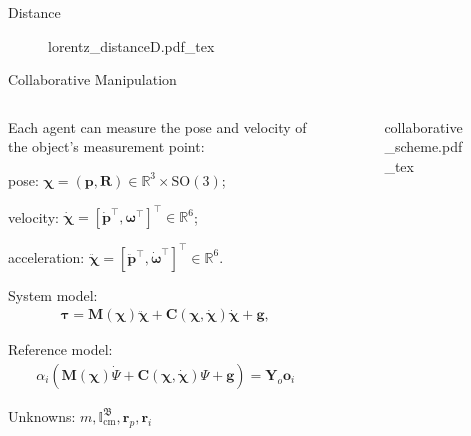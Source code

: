 \begin{frame}{Distance}
    \begin{figure}[ht!]
        \centering
        \def\svgwidth{.9\linewidth}
        {\scriptsize{lorentz_distanceD.pdf_tex}}
    \end{figure}
\end{frame}

\begin{frame}{Collaborative Manipulation}
    \begin{columns}[c]
        \begin{column}{0.4\linewidth}
            Each agent can measure the pose and velocity of the object's measurement point:

            \quad pose: $\boldsymbol{\chi} = (\mathbf{p}, \mathbf{R}) \in \mathbb{R}^3\times \text{SO}(3)$;
            
            \quad velocity: $\dot{\boldsymbol{\chi}} = \left[\dot{\mathbf{p}}^\top, \boldsymbol{\omega}^\top \right]^\top\in\mathbb{R}^6$;
            
            \quad acceleration: $\ddot{\boldsymbol{\chi}} = \left[\ddot{\mathbf{p}}^\top, \dot{\boldsymbol{\omega}}^\top \right]^\top\in\mathbb{R}^6$.

            System model:
            \begin{align*}
                \boldsymbol{\tau } = \mathbf {M}(\boldsymbol{\chi})\ddot{\boldsymbol{\chi}} + \mathbf {C}(\boldsymbol{\chi},\dot{\boldsymbol{\chi}})\dot{\boldsymbol{\chi}} + \mathbf{g},
            \end{align*}

            Reference model:
            \begin{align*}
                \alpha _i \left(\mathbf {M}(\boldsymbol{\chi})\dot{\Psi} + \mathbf {C}(\boldsymbol{\chi},\dot{\boldsymbol{\chi}})\Psi + \mathbf {g} \right) = \mathbf{Y}_o\mathbf{o}_i
            \end{align*}

            Unknowns: $m, \mathbb{I}_\text{cm}^\mathfrak{B}, \mathbf{r}_p, \mathbf{r}_i$
        \end{column}
        \begin{column}{0.6\linewidth}
            \begin{figure}[ht!]
                \centering
                \def\svgwidth{\linewidth}
                {\scriptsize{collaborative_scheme.pdf_tex}}
            \end{figure}
        \end{column}
    \end{columns}
\end{frame}

